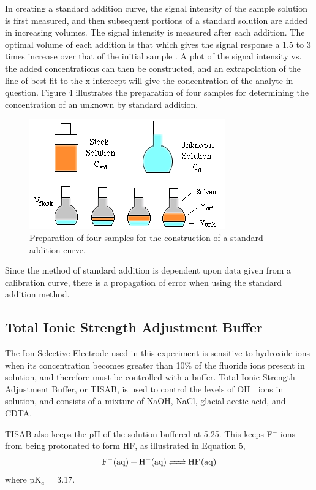 \documentclass[journal=jacsat,manuscript=article,layout=twocolumn]{achemso}
\begin{document}
In creating a standard addition curve, the signal intensity of the sample
solution is first measured, and then subsequent portions of a standard solution
are added in increasing volumes. The signal intensity is measured after each addition.
The optimal volume of each addition is that which gives the signal response a 1.5 to 3 times increase over
that of the initial sample \cite{aviv}.
A plot of the signal intensity vs. the added concentrations can then be constructed, and an extrapolation of
the line of best fit to the x-intercept will give the concentration of the analyte in question.
Figure 4 illustrates the preparation of four samples for determining the concentration of an unknown by standard
addition\cite{zellmer}.
\begin{figure}
    \includegraphics[scale=0.65]{stdadd}
    \caption{Preparation of four samples for the construction of a standard addition curve.}
\end{figure}
Since the method of standard addition is dependent upon data given from a
calibration curve, there is a propagation of error when using the standard addition
method.

\subsection {Total Ionic Strength Adjustment Buffer}
The Ion Selective Electrode used in this experiment is sensitive to hydroxide
ions when its concentration becomes greater than 10\% of the fluoride ions
present in solution, and therefore must be controlled with a buffer\cite{nmt}.
Total Ionic Strength Adjustment Buffer, or TISAB, is used to control the levels of OH$^-$
ions in solution, and consists of a mixture of NaOH, NaCl, glacial acetic acid,
and CDTA.

TISAB also keeps the pH of the solution buffered at 5.25\cite{nmt}. This keeps
F$^-$ ions from being protonated to form HF, as illustrated in Equation 5,
\begin{equation}
    \ce {F^-(aq) + H^+(aq) <=> HF(aq)} \\
\end{equation}
where pK$_a$ = 3.17.
\end{document}

